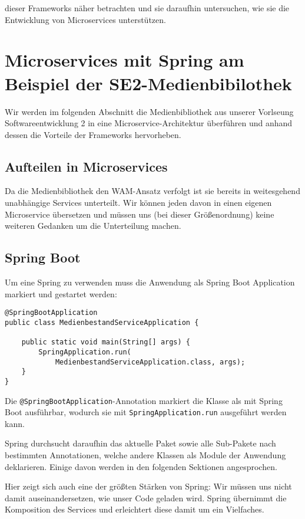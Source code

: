 \documentclass{article}
\begin{document}
dieser Frameworks näher betrachten und sie daraufhin untersuchen, wie sie die Entwicklung von Microservices unterstützen.

\section{Microservices mit Spring am Beispiel der SE2-Medienbibilothek}

Wir werden im folgenden Abschnitt die Medienbibliothek aus unserer Vorlseung Softwareentwicklung 2 in eine Microservice-Architektur überführen und anhand dessen die Vorteile der Frameworks hervorheben.

\subsection{Aufteilen in Microservices}

Da die Medienbibliothek den WAM-Ansatz verfolgt ist sie bereits in weitesgehend unabhängige Services unterteilt. Wir können jeden davon in einen eigenen Microservice übersetzen und müssen uns (bei dieser Größenordnung) keine weiteren Gedanken um die Unterteilung machen.

\subsection{Spring Boot}

Um eine Spring zu verwenden muss die Anwendung als Spring Boot Application markiert und gestartet werden:

\begin{lstlisting}
@SpringBootApplication
public class MedienbestandServiceApplication {

    public static void main(String[] args) {
        SpringApplication.run(
        	MedienbestandServiceApplication.class, args);
    }
}
\end{lstlisting}

Die \texttt{@SpringBootApplication}-Annotation markiert die Klasse als mit Spring Boot ausführbar, wodurch sie mit \texttt{SpringApplication.run} ausgeführt werden kann.

Spring durchsucht daraufhin das aktuelle Paket sowie alle Sub-Pakete nach bestimmten Annotationen, welche andere Klassen als Module der Anwendung deklarieren. Einige davon werden in den folgenden Sektionen angesprochen.

Hier zeigt sich auch eine der größten Stärken von Spring: Wir müssen uns nicht damit auseinandersetzen, wie unser Code geladen wird. Spring übernimmt die Komposition des Services und erleichtert diese damit um ein Vielfaches.
\end{document}
